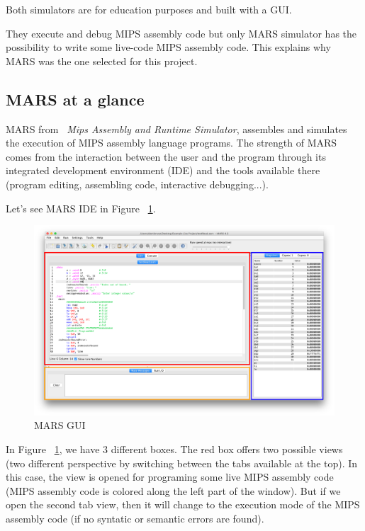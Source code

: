 \documentclass[
  oneside,
  11pt, a4paper,
  footinclude=true,
  headinclude=true,
  cleardoublepage=empty
]{scrbook}
\begin{document}
Both simulators are for education purposes and built with a GUI.

They execute and debug MIPS assembly code but only MARS simulator has the possibility to write some live-code MIPS assembly code. This explains why MARS was the one selected for this project.

\subsection{MARS at a glance}

MARS from ~\textit{Mips Assembly and Runtime Simulator}, assembles and simulates the execution of MIPS assembly language programs. The strength of MARS comes from the interaction between the user and the program through its integrated development environment (IDE) and the tools available there (program editing, assembling code, interactive debugging...).

Let's see MARS IDE in Figure ~\ref{fig:MARS_GUI}.

\begin{figure}[h!]
  \centering
    \includegraphics[width=1\textwidth]{img/MARS_GUI.png}
    \caption{MARS GUI}
    \label{fig:MARS_GUI}
\end{figure}

In Figure ~\ref{fig:MARS_GUI}, we have 3 different boxes.
The red box offers two possible views (two different perspective by switching between the tabs available at the top).
In this case, the view is opened for programing some live MIPS assembly code (MIPS assembly code is colored along the left part of the window).
But if we open the second tab view, then it will change to the execution mode of the MIPS assembly code (if no syntatic or semantic errors are found).
\end{document}
